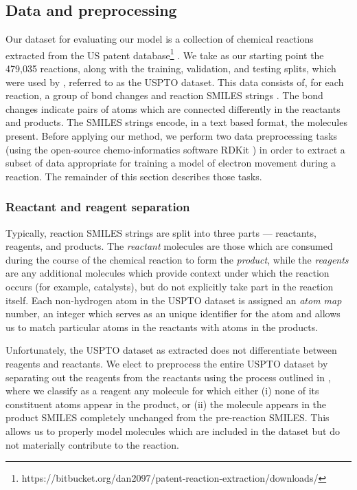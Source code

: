
\subsection{Data and preprocessing}

Our dataset for evaluating our model is a collection of chemical reactions extracted from the US patent database\footnote{https://bitbucket.org/dan2097/patent-reaction-extraction/downloads/} \citep{lowe2012extraction}   .
We take as our starting point the 479,035 reactions, along with the training, validation, and testing splits, 
which were used by \citet{jin2017predicting}, referred to as the USPTO dataset.
This data consists of, for each reaction, a group of bond changes and reaction SMILES strings \citep{weininger1988smiles}.
The bond changes indicate pairs of atoms which are connected differently in the reactants and products.
The SMILES strings encode, in a text based format, the molecules present.
Before applying our method, we perform two data preprocessing tasks (using the open-source chemo-informatics software RDKit
  \citep{rdkit}) in order to extract a subset of data appropriate for training a
 model of electron movement during a reaction. The remainder of this section describes those tasks.

\subsubsection{Reactant and reagent separation}

Typically, reaction SMILES strings are split into three parts --- reactants, reagents, and products.
The {\em reactant} molecules are those which are consumed during the course of the chemical reaction to form the {\em product}, 
while the {\em reagents} are any additional molecules which provide context under which the reaction occurs (for example, catalysts),
but do not explicitly take part in the reaction  itself.
Each non-hydrogen atom in the USPTO dataset is assigned an {\em atom map} number, an integer which serves as an unique identifier for the atom and allows us to match particular atoms in the reactants with atoms in the products.

Unfortunately, the USPTO dataset as extracted does not differentiate between reagents and reactants.
We elect to preprocess the entire USPTO dataset by separating out the reagents from the reactants using the process outlined in \citet{schwaller2017found}, where we classify as a reagent any molecule for which either 
(i) none of its constituent atoms appear in the product, or 
(ii) the molecule appears in the product SMILES completely unchanged from the pre-reaction SMILES.
This allows us to properly model molecules which are included in the dataset but do not materially contribute to the reaction.

